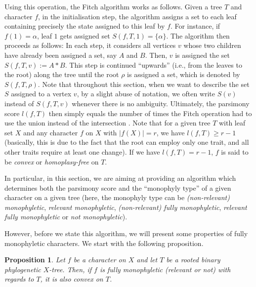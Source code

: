 \documentclass{amsart}
\newtheorem{proposition}[theorem]{Proposition}
\theoremstyle{definition}
\begin{document}
Using this operation, the Fitch algorithm works as follows. Given a tree $T$ and  character $f$, in the initialisation step, the algorithm assigns a set to each leaf containing precisely the state assigned to this leaf by $f$. For instance, if $f(1)=\alpha$, leaf $1$ gets assigned set $S(f,T,1)=\{\alpha\}$. The algorithm then proceeds as follows: In each step, it considers all vertices $v$ whose two children have already been assigned a set, say $A$ and $B$. Then, $v$ is assigned the set $S(f,T,v):=A*B$. This step is continued \enquote{upwards} (i.e., from the leaves to the root) along the tree until the root $\rho$ is assigned a set, which is denoted by $S(f,T,\rho)$. Note that throughout this section, when we want to describe the set $S$ assigned to a vertex $v$, by a slight abuse of notation, we often write $S(v)$ instead of $S(f,T,v)$ whenever there is no ambiguity. Ultimately, the parsimony score $l(f,T)$ then simply equals the number of times the Fitch operation had to use the union instead of the intersection \cite{Fitch,Hartigan1973}. Note that for a given tree $T$ with leaf set $X$ and any character $f$ on $X$ with $|f(X)|=r$, we have $l(f,T)\geq r-1$ (basically, this is due to the fact that the root can employ only one trait, and all other traits require at least one change). If we have $l(f,T)=r-1$, $f$ is said to be \emph{convex} or \emph{homoplasy-free} on $T$.


In particular, in this section, we are aiming at providing an algorithm which determines both the parsimony score and the \enquote{monophyly type} of a given character on a given tree (here, the monophyly type can be \emph{(non-relevant) monophyletic}, \emph{relevant monophyletic}, \emph{ (non-relevant) fully monophyletic}, \emph{relevant fully monophyletic} or \emph{not monophyletic}). 

However, before we state this algorithm, we will present some properties of fully monophyletic characters. We start with the following proposition.

\begin{proposition}\label{prop:convex} Let $f$ be a character on $X$ and let $T$ be a rooted binary phylogenetic $X$-tree. Then, if $f$ is fully monophyletic (relevant or not) with regards to $T$, it is also convex on $T$. 
\end{proposition}
\end{document}
